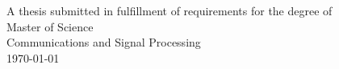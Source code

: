 \begin{titlepage}


{\large A thesis submitted in fulfillment of requirements for the degree of}\\[0.5cm]
{\large Master of Science}\\[0.5cm]
{\large Communications and Signal Processing}\\[0.5cm]
{\large \today}\\[2cm] %

\vfill %

\end{titlepage} 